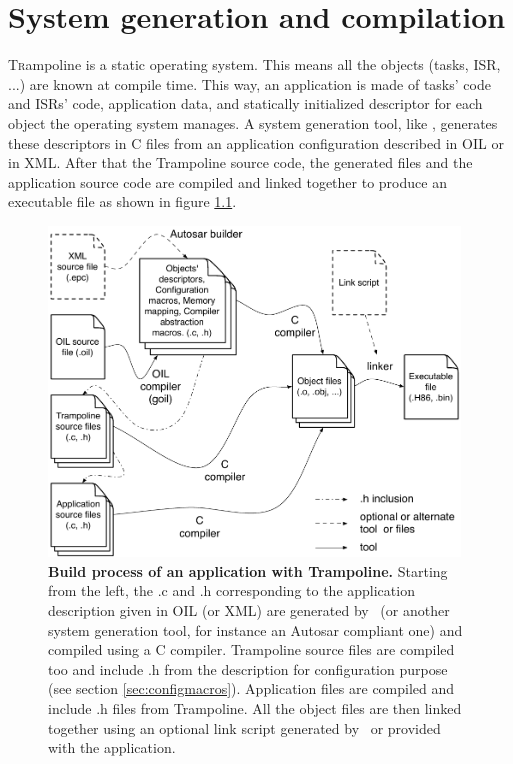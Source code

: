 
\chapter{System generation and compilation}

\lettrine{T}rampoline is a static operating system. This means all the objects (tasks, ISR, ...) are known at compile time. This way, an application is made of tasks' code and ISRs' code, application data, and statically initialized descriptor for each object the operating system manages. A system generation tool, like \goil, generates these descriptors in C files from an application configuration described in OIL or in XML. After that the Trampoline source code, the generated files and the application source code are compiled and linked together to produce an executable file as shown in figure \ref{fig:buildtrampoline}.

\begin{figure}[htbp] %
   \centering
   \includegraphics[width=4.3in]{pictures/buildProcess.pdf} 
   \caption{\textbf{Build process of an application with Trampoline.} Starting from the left, the .c and .h corresponding to the application description given in OIL (or XML) are generated by \goil\ (or another system generation tool, for instance an Autosar compliant one) and compiled using a C compiler. Trampoline source files are compiled too and include .h from the description for configuration purpose (see section \ref{sec:configmacros}). Application files are compiled and include .h files from Trampoline. All the object files are then linked together using an optional link script generated by \goil\ or provided with the application.}\label{fig:buildtrampoline}
\end{figure}

